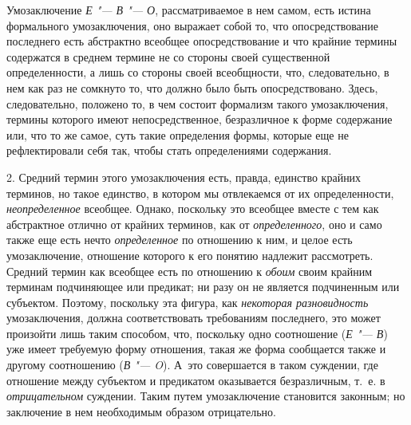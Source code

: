 {{Умозаключение {\em Е "--- В "--- О}, рассматриваемое в нем
самом, есть истина формального умозаключения, оно выражает собой то, что
опосредствование последнего есть абстрактно всеобщее опосредствование и что
крайние термины содержатся в среднем термине не со стороны своей
существенной определенности, а лишь со стороны своей всеобщности, что,
следовательно, в нем как раз не сомкнуто то, что должно было быть
опосредствовано. Здесь, следовательно, положено то, в чем состоит формализм
такого умозаключения, термины которого имеют
непосредственное, безразличное к форме содержание или, что то же самое,
суть такие определения формы, которые еще не рефлектировали себя так, чтобы
стать определениями содержания.

2. Средний термин этого умозаключения есть, правда, единство
крайних терминов, но такое единство, в котором мы отвлекаемся от их
определенности, {\em неопределенное}
всеобщее. Однако, поскольку это всеобщее вместе с тем как
абстрактное отлично от крайних терминов, как от
{\em определенного}, оно
и само также еще есть нечто
{\em определенное} по
отношению к ним, и целое есть умозаключение, отношение которого к его
понятию надлежит рассмотреть. Средний термин как всеобщее есть по отношению
к {\em обоим} своим
крайним терминам подчиняющее или предикат; ни разу он не является
подчиненным или субъектом. Поэтому, поскольку эта фигура, как
{\em некоторая разновидность}
умозаключения, должна соответствовать требованиям последнего,
это может произойти лишь таким способом, что, поскольку одно соотношение
({\em Е "--- В})
уже имеет требуемую форму отношения, такая же форма
сообщается также и другому соотношению
({\em В "--- O}). А~это
совершается в таком суждении, где отношение между субъектом и предикатом
оказывается безразличным, т.~е. в
{\em отрицательном}
суждении. Таким путем умозаключение становится законным; но
заключение в нем необходимым образом
отрицательно.

}}
